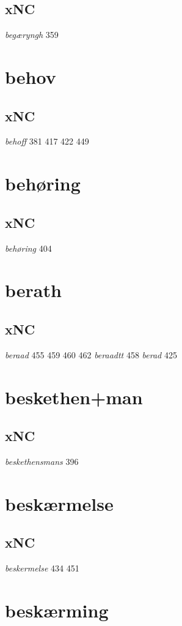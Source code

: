 \documentclass[a4paper,twocolumn]{article}
\begin{document}
\subsection{xNC}
\label{sec:org5d63897}
\emph{begæryngh} 359 
\section{behov}
\label{sec:orgc71fe14}
\subsection{xNC}
\label{sec:orge3aca4b}
\emph{behoff} 381 417 422 449 
\section{behøring}
\label{sec:org6a82720}
\subsection{xNC}
\label{sec:orgf5b0db4}
\emph{behøring} 404 
\section{berath}
\label{sec:org0c5d82b}
\subsection{xNC}
\label{sec:org4648b76}
\emph{beraad} 455 459 460 462 \emph{beraadtt} 458 \emph{berad} 425 
\section{beskethen+man}
\label{sec:org2a684bd}
\subsection{xNC}
\label{sec:org69e76df}
\emph{beskethensmans} 396 
\section{beskærmelse}
\label{sec:org88a8926}
\subsection{xNC}
\label{sec:org361058c}
\emph{beskermelse} 434 451 
\section{beskærming}
\label{sec:org9628e89}
\end{document}
